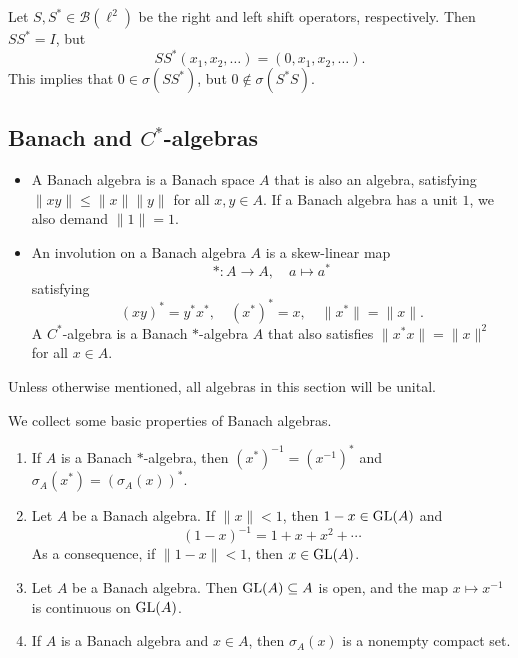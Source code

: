 \begin{example}
  Let $S, S^* \in \mathcal{B}(\ell^2)$ be the right and left shift operators, respectively.
  Then $S S^* = I$, but $$S S^* (x_1, x_2, \dots) = (0, x_1, x_2, \dots).$$
  This implies that $0 \in \sigma (S S^*)$, but $0 \notin \sigma (S^* S)$.
\end{example}

\subsection{Banach and $C^*$-algebras}

\begin{definition}
  \begin{itemize}
    \item A Banach algebra is a Banach space $A$ that is also an algebra, satisfying $\|xy\| \leq \|x\| \|y\|$ for all $x, y \in A$.
    If a Banach algebra has a unit $1$, we also demand $\|1\| = 1$.
    \item An involution on a Banach algebra $A$ is a skew-linear map $$*: A \to A,\quad a \mapsto a^*$$
    satisfying $$(xy)^* = y^* x^*,\quad (x^*)^* = x,\quad \|x^*\| = \|x\|.$$
    A $C^*$-algebra is a Banach $*$-algebra $A$ that also satisfies $\|x^* x\| = \|x\|^2$ for all $x \in A$.
  \end{itemize}
\end{definition}

Unless otherwise mentioned, all algebras in this section will be unital.
\begin{proposition}
  We collect some basic properties of Banach algebras.
  \begin{enumerate}
    \item If $A$ is a Banach $*$-algebra, then 
    $(x^*)^{-1} = (x^{-1})^*$ and $\sigma_A (x^*) = (\sigma_A (x))^*.$
    \item Let $A$ be a Banach algebra. If $\|x\| < 1$, then $1 - x \in \operatorname{GL} (A)$ and 
    $$(1 - x)^{-1} = 1 + x + x^2 + \cdots$$ As a consequence, if $\| 1 - x\| < 1$, then $x \in \operatorname{GL} (A)$.
    \item Let $A$ be a Banach algebra. Then $\operatorname{GL}(A) \subseteq A$ is open, and the map $x \mapsto x^{-1}$ is continuous on $\operatorname{GL} (A)$.
    \item If $A$ is a Banach algebra and $x \in A$, then $\sigma_A (x)$ is a nonempty compact set.
  \end{enumerate}
\end{proposition}

